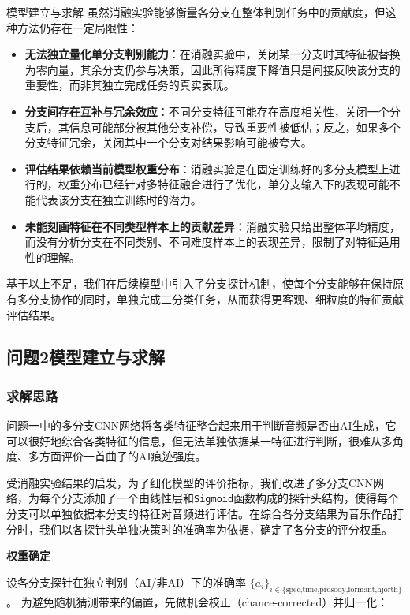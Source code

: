 \documentclass[aspectratio=169]{beamer}
\providecommand{\paragraph}[1]{\smallskip\textbf{#1}\par}
\begin{document}
\begin{frame}{模型建立与求解}
虽然消融实验能够衡量各分支在整体判别任务中的贡献度，但这种方法仍存在一定局限性：  
\begin{itemize}
  \item \textbf{无法独立量化单分支判别能力}：在消融实验中，关闭某一分支时其特征被替换为零向量，其余分支仍参与决策，因此所得精度下降值只是间接反映该分支的重要性，而非其独立完成任务的真实表现。  
  \item \textbf{分支间存在互补与冗余效应}：不同分支特征可能存在高度相关性，关闭一个分支后，其信息可能部分被其他分支补偿，导致重要性被低估；反之，如果多个分支特征冗余，关闭其中一个分支对结果影响可能被夸大。  
  \item \textbf{评估结果依赖当前模型权重分布}：消融实验是在固定训练好的多分支模型上进行的，权重分布已经针对多特征融合进行了优化，单分支输入下的表现可能不能代表该分支在独立训练时的潜力。  
  \item \textbf{未能刻画特征在不同类型样本上的贡献差异}：消融实验只给出整体平均精度，而没有分析分支在不同类别、不同难度样本上的表现差异，限制了对特征适用性的理解。  
\end{itemize}
基于以上不足，我们在后续模型中引入了分支探针机制，使每个分支能够在保持原有多分支协作的同时，单独完成二分类任务，从而获得更客观、细粒度的特征贡献评估结果。


\subsection{问题2模型建立与求解}
\subsubsection{求解思路}
问题一中的多分支CNN网络将各类特征整合起来用于判断音频是否由AI生成，它可以很好地综合各类特征的信息，但无法单独依据某一特征进行判断，很难从多角度、多方面评价一首曲子的AI痕迹强度。

受消融实验结果的启发，为了细化模型的评价指标，我们改进了多分支CNN网络，为每个分支添加了一个由线性层和\texttt{Sigmoid}函数构成的探针头结构，使得每个分支可以单独依据本分支的特征对音频进行评估。在综合各分支结果为音乐作品打分时，我们以各探针头单独决策时的准确率为依据，确定了各分支的评分权重。

\paragraph{权重确定} 设各分支探针在独立判别（AI/非AI）下的准确率
$\{a_i\}_{i\in\{\text{spec,time,prosody,formant,hjorth}\}}$。
为避免随机猜测带来的偏置，先做机会校正（chance-corrected）并归一化：


\end{frame}
\end{document}
